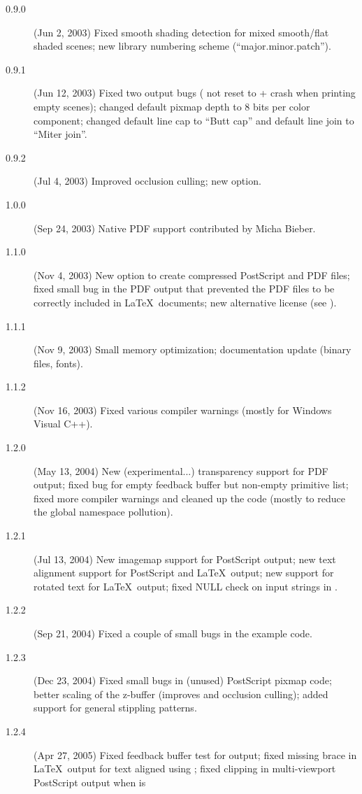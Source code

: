\begin{description}
\item[0.9.0] (Jun 2, 2003) Fixed smooth shading detection for mixed
  smooth/flat shaded scenes; new library numbering scheme
  (``major.minor.patch'').
\item[0.9.1] (Jun 12, 2003) Fixed two  output bugs
  ( not reset to  + crash when printing empty
  scenes); changed default pixmap depth to 8 bits per color component;
  changed default line cap to ``Butt cap'' and default line join to ``Miter
  join''.
\item[0.9.2] (Jul 4, 2003) Improved occlusion culling; new
   option.
\item[1.0.0] (Sep 24, 2003) Native PDF support contributed by Micha
  Bieber.
\item[1.1.0] (Nov 4, 2003) New  option to create
  compressed PostScript and PDF files; fixed small bug in the PDF
  output that prevented the PDF files to be correctly included in
  \LaTeX\ documents; new alternative license (see ).
\item[1.1.1] (Nov 9, 2003) Small memory optimization; documentation update
  (binary files, fonts).
\item[1.1.2] (Nov 16, 2003) Fixed various compiler warnings (mostly
  for Windows Visual C++).
\item[1.2.0] (May 13, 2004) New (experimental...) transparency support for
  PDF output; fixed bug for empty feedback buffer but non-empty primitive
  list; fixed more compiler warnings and cleaned up the code (mostly to
  reduce the global namespace pollution).
\item[1.2.1] (Jul 13, 2004) New imagemap support for PostScript output; new
 text alignment support for PostScript and \LaTeX\ output; new support for
 rotated text for \LaTeX\ output; fixed NULL check on input strings in
 .
\item[1.2.2] (Sep 21, 2004) Fixed a couple of small bugs in the example
  code.
\item[1.2.3] (Dec 23, 2004) Fixed small bugs in (unused) PostScript pixmap
  code; better scaling of the z-buffer (improves
   and occlusion culling); added support
  for general stippling patterns.
\item[1.2.4] (Apr 27, 2005) Fixed feedback buffer test for
   output; fixed missing brace in \LaTeX\ output for
  text aligned using ; fixed clipping in
  multi-viewport PostScript output when  is

\end{description}
